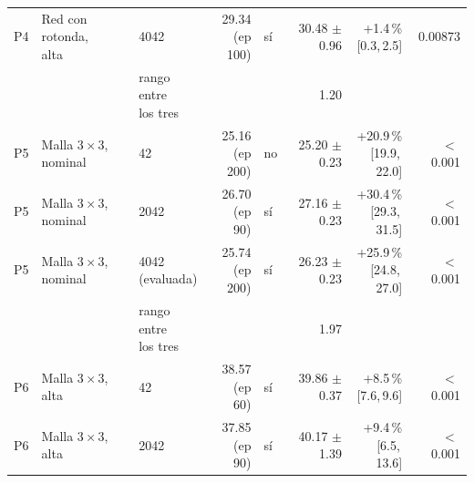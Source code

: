 \begin{table}[H]
\begin{tabular}{lllrlrrr}
P4 & \makecell[l]{Red con rotonda,\\{}alta} & 4042 & \makecell[r]{29.34\\{}(ep 100)} & sí & \makecell[r]{30.48\\{}$\pm$ 0.96} & \makecell[r]{+1.4\,\%\\{}[0.3,\,2.5]} & 0.00873 \\
 & & \makecell[l]{rango entre\\{}los tres} & & & 1.20 & & \\
P5 & \makecell[l]{Malla $3 \times 3$,\\{}nominal} & 42 & \makecell[r]{25.16\\{}(ep 200)} & no & \makecell[r]{25.20\\{}$\pm$ 0.23} & \makecell[r]{+20.9\,\%\\{}[19.9,\,22.0]} & $<$\,0.001 \\
P5 & \makecell[l]{Malla $3 \times 3$,\\{}nominal} & 2042 & \makecell[r]{26.70\\{}(ep 90)} & sí & \makecell[r]{27.16\\{}$\pm$ 0.23} & \makecell[r]{+30.4\,\%\\{}[29.3,\,31.5]} & $<$\,0.001 \\
P5 & \makecell[l]{Malla $3 \times 3$,\\{}nominal} & \makecell[l]{4042\\{}(evaluada)} & \makecell[r]{25.74\\{}(ep 200)} & sí & \makecell[r]{26.23\\{}$\pm$ 0.23} & \makecell[r]{+25.9\,\%\\{}[24.8,\,27.0]} & $<$\,0.001 \\
 & & \makecell[l]{rango entre\\{}los tres} & & & 1.97 & & \\
P6 & \makecell[l]{Malla $3 \times 3$,\\{}alta} & 42 & \makecell[r]{38.57\\{}(ep 60)} & sí & \makecell[r]{39.86\\{}$\pm$ 0.37} & \makecell[r]{+8.5\,\%\\{}[7.6,\,9.6]} & $<$\,0.001 \\
P6 & \makecell[l]{Malla $3 \times 3$,\\{}alta} & 2042 & \makecell[r]{37.85\\{}(ep 90)} & sí & \makecell[r]{40.17\\{}$\pm$ 1.39} & \makecell[r]{+9.4\,\%\\{}[6.5,\,13.6]} & $<$\,0.001 \\

\end{tabular}
\end{table}
